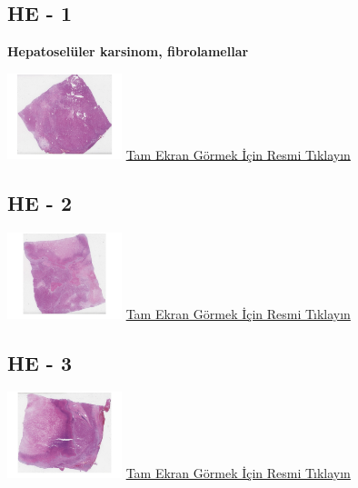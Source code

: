 \documentclass[
  letterpaper,
  DIV=11,
  numbers=noendperiod]{scrreprt}
\begin{document}
\hypertarget{he---1-1}{%
\subsection{HE - 1}\label{he---1-1}}

\textbf{Hepatoselüler karsinom, fibrolamellar}

\href{https://images.patolojiatlasi.com/fibrolamellar-hepatocellular-carcinoma/HE1.html}{\includegraphics[width=0.25\textwidth,height=\textheight]{./screenshots/thumbnail_fibrolamellar-hepatocellular-carcinoma-1.png}}
\href{https://images.patolojiatlasi.com/fibrolamellar-hepatocellular-carcinoma/HE1.html}{Tam
Ekran Görmek İçin Resmi Tıklayın}

\hypertarget{he---2-1}{%
\subsection{HE - 2}\label{he---2-1}}

\href{https://images.patolojiatlasi.com/fibrolamellar-hepatocellular-carcinoma/HE2.html}{\includegraphics[width=0.25\textwidth,height=\textheight]{./screenshots/thumbnail_fibrolamellar-hepatocellular-carcinoma-2.png}}
\href{https://images.patolojiatlasi.com/fibrolamellar-hepatocellular-carcinoma/HE2.html}{Tam
Ekran Görmek İçin Resmi Tıklayın}

\hypertarget{he---3-1}{%
\subsection{HE - 3}\label{he---3-1}}

\href{https://images.patolojiatlasi.com/fibrolamellar-hepatocellular-carcinoma/HE3.html}{\includegraphics[width=0.25\textwidth,height=\textheight]{./screenshots/thumbnail_fibrolamellar-hepatocellular-carcinoma-3.png}}
\href{https://images.patolojiatlasi.com/fibrolamellar-hepatocellular-carcinoma/HE3.html}{Tam
Ekran Görmek İçin Resmi Tıklayın}
\end{document}
